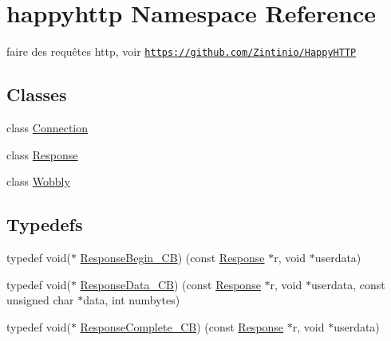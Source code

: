 \hypertarget{namespacehappyhttp}{}\section{happyhttp Namespace Reference}
\label{namespacehappyhttp}


faire des requêtes http, voir \href{https://github.com/Zintinio/HappyHTTP}{\tt https\+://github.\+com/\+Zintinio/\+Happy\+H\+T\+TP}  


\subsection*{Classes}
\begin{DoxyCompactItemize}
\item 
class \hyperlink{classhappyhttp_1_1_connection}{Connection}
\item 
class \hyperlink{classhappyhttp_1_1_response}{Response}
\item 
class \hyperlink{classhappyhttp_1_1_wobbly}{Wobbly}
\end{DoxyCompactItemize}
\subsection*{Typedefs}
\begin{DoxyCompactItemize}
\item 
typedef void($\ast$ \hyperlink{namespacehappyhttp_a1997a4fe11e48d3b2b6bedbb246e8975}{Response\+Begin\+\_\+\+CB}) (const \hyperlink{classhappyhttp_1_1_response}{Response} $\ast$r, void $\ast$userdata)
\item 
typedef void($\ast$ \hyperlink{namespacehappyhttp_a818d88091992f5d95f2c53708511fd49}{Response\+Data\+\_\+\+CB}) (const \hyperlink{classhappyhttp_1_1_response}{Response} $\ast$r, void $\ast$userdata, const unsigned char $\ast$data, int numbytes)
\item 
typedef void($\ast$ \hyperlink{namespacehappyhttp_ae70d6705a8684783ce996b296e181ede}{Response\+Complete\+\_\+\+CB}) (const \hyperlink{classhappyhttp_1_1_response}{Response} $\ast$r, void $\ast$userdata)
\end{DoxyCompactItemize}
